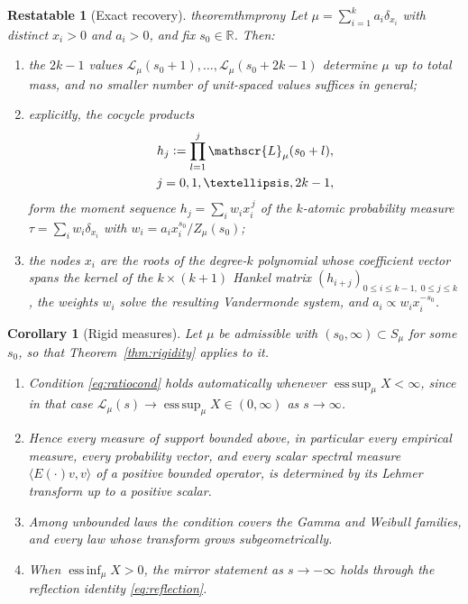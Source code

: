 \documentclass[10pt,a4paper]{amsart}
\newtheorem{restatable}{Restatable}
\newtheorem{corollary}{Corollary}
\providecommand{\Leh}{\mathscr{L}}
\providecommand{\R}{\mathbb{R}}
\providecommand{\eqdef}{\mathrel{\vcentcolon=}}
\providecommand{\essinf}{\operatorname{ess\,inf}}
\providecommand{\esssup}{\operatorname{ess\,sup}}
\begin{document}
	\begin{restatable}[Exact recovery]{theorem}{thmprony}
		\label{thm:prony}
		Let $\mu=\sum_{i=1}^{k}a_i\delta_{x_i}$ with distinct $x_i>0$ and
		$a_i>0$, and fix $s_0\in\R$. Then:
		\begin{enumerate}[label=\textup{(\roman*)},leftmargin=2.2em]
			\item the $2k-1$ values
			$\Leh_\mu(s_0+1),\dots,\Leh_\mu(s_0+2k-1)$ determine $\mu$ up
			to total mass, and no smaller number of unit-spaced values
			suffices in general;
			\item explicitly, the cocycle products
			\begin{equation}\label{eq:hj}
				\begin{gathered}
					h_j\eqdef\prod_{l=1}^{j}\Leh_\mu(s_0+l),\\
					j=0,1,\dots,2k-1,
				\end{gathered}
			\end{equation}
			form the moment sequence $h_j=\sum_iw_ix_i^{\,j}$ of the
			$k$-atomic probability measure
			$\tau=\sum_iw_i\delta_{x_i}$ with
			$w_i=a_ix_i^{s_0}/Z_\mu(s_0)$;
			\item the nodes $x_i$ are the roots of the degree-$k$
			polynomial whose coefficient vector spans the kernel of the
			$k\times(k+1)$ Hankel matrix
			$(h_{i+j})_{0\le i\le k-1,\;0\le j\le k}$, the weights $w_i$
			solve the resulting Vandermonde system, and
			$a_i\propto w_ix_i^{-s_0}$.
		\end{enumerate}
	\end{restatable}

	\begin{corollary}[Rigid measures]\label{cor:rigid}
		Let $\mu$ be admissible with $(s_0,\infty)\subset S_\mu$ for some
		$s_0$, so that Theorem~\ref{thm:rigidity} applies to it.
		\begin{enumerate}[label=\textup{(\roman*)},leftmargin=2.2em]
			\item Condition \eqref{eq:ratiocond} holds automatically
			whenever $\esssup_\mu X<\infty$, since in that case
			$\Leh_\mu(s)\to\esssup_\mu X\in(0,\infty)$ as
			$s\to\infty$.
			\item Hence every measure of support bounded above, in
			particular every empirical measure, every probability vector,
			and every scalar spectral measure
			$\langle E(\cdot)v,v\rangle$ of a positive bounded
			operator, is determined by its Lehmer transform up to a
			positive scalar.
			\item Among unbounded laws the condition covers the Gamma and
			Weibull families, and every law whose transform grows
			subgeometrically.
			\item When ${\essinf_\mu X>0}$, the mirror statement as
			$s\to-\infty$ holds through the reflection identity
			\eqref{eq:reflection}.
		\end{enumerate}
	\end{corollary}
\end{document}
